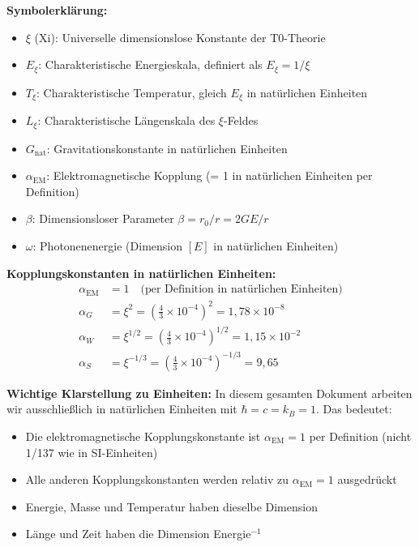 \documentclass[12pt,a4paper]{article}
\theoremstyle{definition}
\theoremstyle{remark}
\begin{document}
	\textbf{Symbolerkl\"arung:}
	\begin{itemize}
		\item $\xi$ (Xi): Universelle dimensionslose Konstante der T0-Theorie
		\item $E_\xi$: Charakteristische Energieskala, definiert als $E_\xi = 1/\xi$
		\item $T_\xi$: Charakteristische Temperatur, gleich $E_\xi$ in nat\"urlichen Einheiten
		\item $L_\xi$: Charakteristische L\"angenskala des $\xi$-Feldes
		\item $G_{\text{nat}}$: Gravitationskonstante in nat\"urlichen Einheiten
		\item $\alpha_{\text{EM}}$: Elektromagnetische Kopplung (= 1 in nat\"urlichen Einheiten per Definition)
		\item $\beta$: Dimensionsloser Parameter $\beta = r_0/r = 2GE/r$
		\item $\omega$: Photonenenergie (Dimension $[E]$ in nat\"urlichen Einheiten)
	\end{itemize}
	
	\textbf{Kopplungskonstanten in nat\"urlichen Einheiten:}
	\begin{align}
		\alpha_{\text{EM}} &= 1 \quad \text{(per Definition in nat\"urlichen Einheiten)} \\
		\alpha_G &= \xi^2 = \left(\frac{4}{3} \times 10^{-4}\right)^2 = 1{,}78 \times 10^{-8} \\
		\alpha_W &= \xi^{1/2} = \left(\frac{4}{3} \times 10^{-4}\right)^{1/2} = 1{,}15 \times 10^{-2} \\
		\alpha_S &= \xi^{-1/3} = \left(\frac{4}{3} \times 10^{-4}\right)^{-1/3} = 9{,}65
	\end{align}
	
	\textbf{Wichtige Klarstellung zu Einheiten:}
	In diesem gesamten Dokument arbeiten wir ausschlie\ss{}lich in nat\"urlichen Einheiten mit $\hbar = c = k_B = 1$. Das bedeutet:
	\begin{itemize}
		\item Die elektromagnetische Kopplungskonstante ist $\alpha_{\text{EM}} = 1$ per Definition (nicht 1/137 wie in SI-Einheiten)
		\item Alle anderen Kopplungskonstanten werden relativ zu $\alpha_{\text{EM}} = 1$ ausgedr\"uckt
		\item Energie, Masse und Temperatur haben dieselbe Dimension
		\item L\"ange und Zeit haben die Dimension Energie$^{-1}$
	\end{itemize}
	
\end{document}
